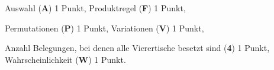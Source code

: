 \begin{bewertung}
\begin{teilaufgaben}
\item
Auswahl ({\bf A}) 1 Punkt, Produktregel ({\bf F}) 1 Punkt,
\item
Permutationen ({\bf P}) 1 Punkt, Variationen ({\bf V}) 1 Punkt,
\item
Anzahl Belegungen, bei denen alle Vierertische besetzt sind
({\bf 4}) 1 Punkt,
Wahrscheinlichkeit ({\bf W}) 1 Punkt.
\end{teilaufgaben}
\end{bewertung}



